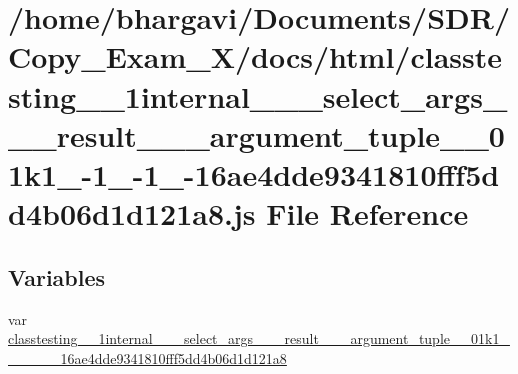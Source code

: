 \hypertarget{classtesting__1__1internal__1__1__select__args__3__01__result__00__01__argument__tuple__00__01k1e9efc5496a0d4be7661116629dab3b29}{}\section{/home/bhargavi/\+Documents/\+S\+D\+R/\+Copy\+\_\+\+Exam\+\_\+X/docs/html/classtesting\+\_\+\_\+1internal\+\_\+\_\+\_\+select\+\_\+args\+\_\+\_\+\_\+result\+\_\+\_\+\_\+argument\+\_\+tuple\+\_\+\_\+01k1\+\_-\/1\+\_-\/1\+\_-\/16ae4dde9341810fff5dd4b06d1d121a8.js File Reference}
\label{classtesting__1__1internal__1__1__select__args__3__01__result__00__01__argument__tuple__00__01k1e9efc5496a0d4be7661116629dab3b29}
\subsection*{Variables}
\begin{DoxyCompactItemize}
\item 
var \hyperlink{classtesting__1__1internal__1__1__select__args__3__01__result__00__01__argument__tuple__00__01k1e9efc5496a0d4be7661116629dab3b29_ac4558e2aa567aa414a11235ae54dd883}{classtesting\+\_\+\_\+1internal\+\_\+\_\+\_\+select\+\_\+args\+\_\+\_\+\_\+result\+\_\+\_\+\_\+argument\+\_\+tuple\+\_\+\_\+01k1\+\_\+\_\+\_\+\_\+\_\+\_\+16ae4dde9341810fff5dd4b06d1d121a8}
\end{DoxyCompactItemize}


